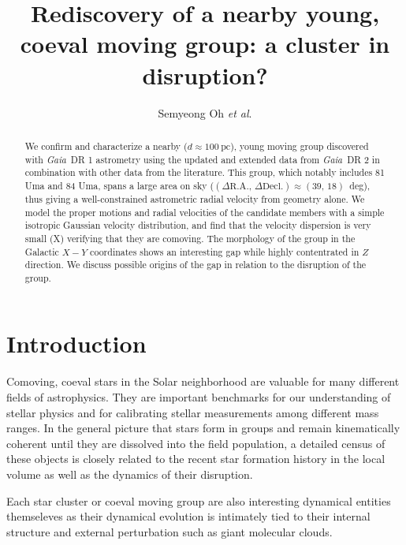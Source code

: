 \documentclass[modern,letterpaper]{aastex61}
\newcommand{\project}[1]{\textsl{#1}}
\newcommand{\gaia}{\project{Gaia}}
\newcommand{\etal}{\textit{et al}.}
\newcommand{\todo}[1]{{\color{crimson}#1}}
\newcommand{\groupDistanceEstimate}{\ensuremath{100~\mathrm{pc}}}
\begin{document}
\sloppy\sloppypar\raggedbottom\frenchspacing %

\title{
  Rediscovery of a nearby young, coeval moving group: a cluster in disruption?
}

\author[0000-0001-7790-5308]{Semyeong Oh \etal}


\begin{abstract}

  We confirm and characterize a nearby ($d \approx \groupDistanceEstimate$),
  young moving group discovered with \gaia\ DR 1 astrometry using the updated
  and extended data from \gaia\ DR 2 in combination with other data from the
  literature.
  This group, which notably includes 81 Uma and 84 Uma, spans a large area
  on sky ($(\Delta\mathrm{R.A.},\,\Delta\mathrm{Decl.})\approx(39,\,18)$~deg),
  thus giving a well-constrained astrometric radial velocity from geometry alone.
  We model the proper motions and radial velocities of the candidate members
  with a simple isotropic Gaussian velocity distribution, and find that the
  velocity dispersion is very small (\todo{X}) verifying that they are comoving.
  The morphology of the group in the Galactic $X-Y$ coordinates shows an
  interesting gap while highly contentrated in $Z$ direction.
  We discuss possible origins of the gap in relation to the disruption of the group.

\end{abstract}

\section{Introduction} %
\label{sec:introduction}

Comoving, coeval stars in the Solar neighborhood are valuable for
many different fields of astrophysics.
They are important benchmarks for our understanding of stellar physics
and for calibrating stellar measurements among different mass ranges.
In the general picture that stars form in groups and remain
kinematically coherent until they are dissolved into the field population,
a detailed census of these objects is closely related to the recent star
formation history in the local volume as well as the dynamics of their disruption.

Each star cluster or coeval moving group are also interesting dynamical entities
themseleves as their dynamical evolution is intimately tied to their internal
structure and external perturbation such as giant molecular clouds.
\end{document}
